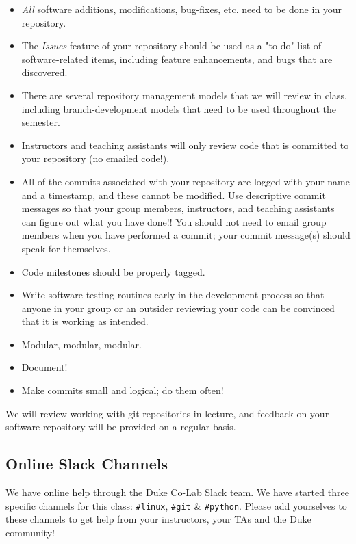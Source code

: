 \begin{itemize}
\item
  \emph{All} software additions, modifications, bug-fixes, etc. need to
  be done in your repository.
\item
  The \emph{Issues} feature of your repository should be used as a "to
  do" list of software-related items, including feature enhancements,
  and bugs that are discovered.
\item
  There are several repository management models that we will review in
  class, including branch-development models that need to be used
  throughout the semester.
\item
  Instructors and teaching assistants will only review code that is
  committed to your repository (no emailed code!).
\item
  All of the commits associated with your repository are logged with
  your name and a timestamp, and these cannot be modified. Use
  descriptive commit messages so that your group members, instructors,
  and teaching assistants can figure out what you have done!! You should
  not need to email group members when you have performed a commit; your
  commit message(s) should speak for themselves.
\item
  Code milestones should be properly tagged.
\item
  Write software testing routines early in the development process so
  that anyone in your group or an outsider reviewing your code can be
  convinced that it is working as intended.
\item
  Modular, modular, modular.
\item
  Document!
\item
  Make commits small and logical; do them often!
\end{itemize}

We will review working with git repositories in lecture, and feedback on
your software repository will be provided on a regular basis.

\subsection*{Online Slack Channels}
We have online help through the \href{https://dukecolab.slack.com/}{Duke
Co-Lab Slack} team. We have started three specific channels for this
class: \texttt{\#linux}, \texttt{\#git} \& \texttt{\#python}. Please add
yourselves to these channels to get help from your instructors, your TAs
and the Duke community!

